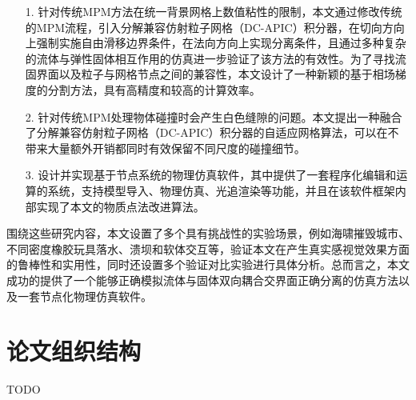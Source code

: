 \begin{enumerate} 
    \item[1.] 针对传统MPM方法在统一背景网格上数值粘性的限制，本文通过修改传统的MPM流程，引入分解兼容仿射粒子网格（DC-APIC）积分器，在切向方向上强制实施自由滑移边界条件，在法向方向上实现分离条件，且通过多种复杂的流体与弹性固体相互作用的仿真进一步验证了该方法的有效性。为了寻找流固界面以及粒子与网格节点之间的兼容性，本文设计了一种新颖的基于相场梯度的分割方法，具有高精度和较高的计算效率。
    \item[2.] 针对传统MPM处理物体碰撞时会产生白色缝隙的问题。本文提出一种融合了分解兼容仿射粒子网格（DC-APIC）积分器的自适应网格算法，可以在不带来大量额外开销都同时有效保留不同尺度的碰撞细节。
    \item[3.] 设计并实现基于节点系统的物理仿真软件，其中提供了一套程序化编辑和运算的系统，支持模型导入、物理仿真、光追渲染等功能，并且在该软件框架内部实现了本文的物质点法改进算法。
 \end{enumerate}
 围绕这些研究内容，本文设置了多个具有挑战性的实验场景，例如海啸摧毁城市、不同密度橡胶玩具落水、溃坝和软体交互等，验证本文在产生真实感视觉效果方面的鲁棒性和实用性，同时还设置多个验证对比实验进行具体分析。总而言之，本文成功的提供了一个能够正确模拟流体与固体双向耦合交界面正确分离的仿真方法以及一套节点化物理仿真软件。

\section{论文组织结构}
TODO